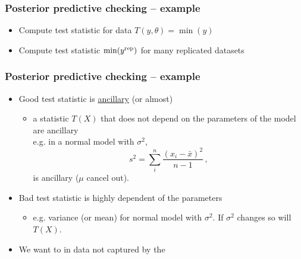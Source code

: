 \documentclass[10pt]{beamer}
\begin{document}

\begin{frame}[fragile]

\frametitle{Posterior predictive checking -- example}

  \begin{itemize}
  \item<1-> Compute test statistic for data $T(y,\theta)=\min(y)$
  \item<2-> Compute test statistic $\min(y^{\rm rep})$ for many replicated datasets
  \end{itemize}
  \vspace{-1.5\baselineskip}

\end{frame}


\begin{frame}[fragile]

\frametitle{Posterior predictive checking -- example}

  \begin{itemize}
  \item<1-> Good test statistic is \href{https://en.wikipedia.org/wiki/Ancillary_statistic}{ancillary} (or almost)
    \begin{itemize}
    \item a statistic $T(X)$ that does not depend on the parameters of the model are ancillary\\e.g. in a normal model with  $\sigma^2$,
    \[
    s^2 = \sum_i^n \frac{(x_i-\bar{x})^2}{n-1}\,,
    \]
    is ancillary ($\mu$ cancel out).
    \end{itemize}
  \item<2-> Bad test statistic is highly dependent of the parameters
    \begin{itemize}
    \item e.g. variance (or mean) for normal model with  $\sigma^2$. If $\sigma^2$ changes so will $T(X)$.
    \end{itemize}
  \item<3-> We want to  in data not captured by the 
  \end{itemize}

\end{frame}
\end{document}
